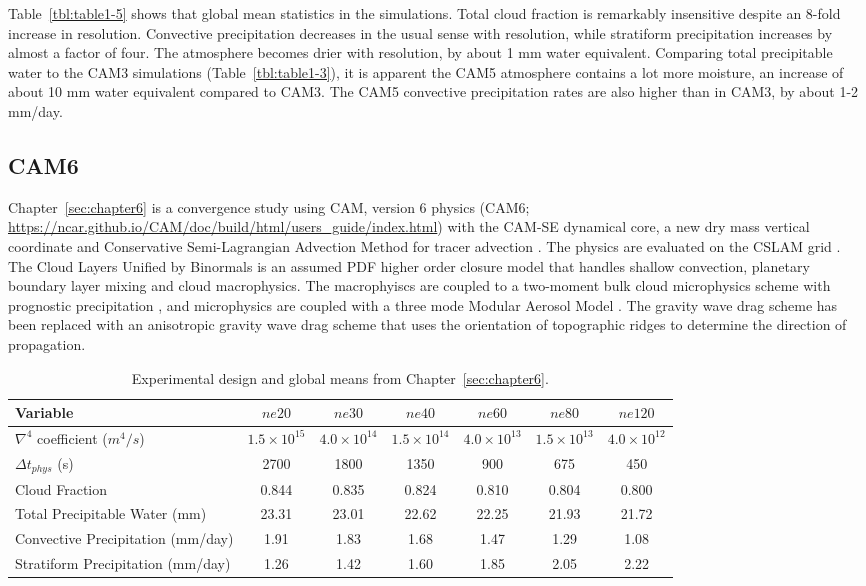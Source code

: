 Table~\ref{tbl:table1-5} shows that global mean statistics in the simulations. Total cloud fraction is remarkably insensitive despite an 8-fold increase in resolution. Convective precipitation decreases in the usual sense with resolution, while stratiform precipitation increases by almost a factor of four. The atmosphere becomes drier with resolution, by about 1 mm water equivalent. Comparing total precipitable water to the CAM3 simulations (Table~\ref{tbl:table1-3}), it is apparent the CAM5 atmosphere contains a lot more moisture, an increase of about 10 mm water equivalent compared to CAM3. The CAM5 convective precipitation rates are also higher than in CAM3, by about 1-2 mm/day.

\subsection{CAM6}

Chapter~\ref{sec:chapter6} is a convergence study using CAM, version 6 physics (CAM6; \url{https://ncar.github.io/CAM/doc/build/html/users_guide/index.html}) with the CAM-SE dynamical core, a new dry mass vertical coordinate \citep{LetAl2018JAMES} and Conservative Semi-Lagrangian Advection Method for tracer advection \citep[CSLAM; ][]{LTOUNGK2017MWR}. The physics are evaluated on the CSLAM grid \citep{HL2018MWR}. The Cloud Layers Unified by Binormals \citep[CLUBB][]{GETAL2002JAS,BOG2013JCLIM} is an assumed PDF higher order closure model that handles shallow convection, planetary boundary layer mixing and cloud macrophysics. The macrophyiscs are coupled to a two-moment bulk cloud microphysics scheme with prognostic precipitation \citep{MG2}, and microphysics are coupled with a three mode Modular Aerosol Model \citep{MAM}. The gravity wave drag scheme has been replaced with an anisotropic gravity wave drag scheme that uses the orientation of topographic ridges to determine the direction of propagation.

 \begin{table}
 \caption{Experimental design and global means from Chapter~\ref{sec:chapter6}.}
 \centering
 \scriptsize
 \begin{tabular}{lcccccc}
 \hline
 Variable & $ne20$ & $ne30$ & $ne40$ & $ne60$ & $ne80$ & $ne120$ \\
   \hline
   $\nabla^{4}$ coefficient ($m^4/s$) & $1.5 \times 10^{15}$ & $4.0 \times 10^{14}$ & $1.5 \times 10^{14}$ & $4.0 \times 10^{13}$  & $1.5 \times 10^{13}$ & $4.0 \times 10^{12}$\\
    $\Delta t_{phys}$ (s) & 2700 & 1800 & 1350 & 900 & 675 & 450 \\
   Cloud Fraction & 0.844 & 0.835 & 0.824 & 0.810 & 0.804 & 0.800 \\ 
   Total Precipitable Water (mm) & 23.31& 23.01 & 22.62 & 22.25 & 21.93 & 21.72 \\
   Convective Precipitation (mm/day) & 1.91 & 1.83 & 1.68 & 1.47 & 1.29 & 1.08 \\
   Stratiform Precipitation (mm/day) & 1.26 & 1.42 & 1.60 & 1.85 & 2.05 & 2.22 \\      
 \hline
 \end{tabular}
 \label{tbl:table1-6}
 \end{table}

